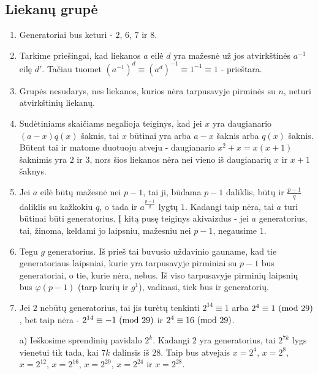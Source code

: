 \subsection*{Liekanų grupė} 
\begin{enumerate} 
\item 
Generatoriai bus keturi - $2$, $6$, $7$ ir $8$.
\item 
Tarkime priešingai, kad liekanos $a$ eilė $d$ yra mažesnė už jos
atvirkštinės $a^{-1}$ eilę $d'$. Tačiau tuomet $(a^{-1})^d \equiv
(a^d)^{-1} \equiv 1^{-1} \equiv 1$ - prieštara.
\item 
Grupės nesudarys, nes liekanos, kurios nėra tarpusavyje pirminės su
$n$, neturi atvirkštinių liekanų.
\item 
Sudėtiniams skaičiams negalioja teiginys, kad jei $x$ yra daugianario
$(a-x)q(x)$ šaknis, tai $x$ būtinai yra arba $a-x$ šaknis arba
$q(x)$ šaknis. Būtent tai ir matome duotuoju atveju - daugianario
$x^2+x = x(x+1)$ šaknimis yra $2$ ir $3$, nors šios liekanos nėra nei
vieno iš daugianarių $x$ ir $x+1$ šaknys. 
\item 
Jei $a$ eilė būtų mažesnė nei $p-1$, tai ji, būdama $p-1$ daliklis,
būtų ir $\frac{p-1}{q}$ daliklis su kažkokiu $q$, o tada ir
$a^{\frac{p-1}{q}}$ lygtų $1$. Kadangi taip nėra, tai $a$ turi būtinai
būti generatorius. Į kitą pusę teiginys akivaizdus - jei $a$
generatorius, tai, žinoma, keldami jo laipsniu, mažesniu nei
$p-1$, negausime $1$. 
\item 
Tegu $g$ generatorius. Iš prieš tai buvusio uždavinio gauname, kad tie
generatoriaus laipsniai, kurie yra tarpusavyje pirminiai su $p-1$ bus
generatoriai, o tie, kurie nėra, nebus. Iš viso tarpusavyje pirminių
laipsnių bus $\varphi(p-1)$ (tarp kurių ir $g^1$), vadinasi, tiek bus
ir generatorių.
\item 
Jei $2$ nebūtų generatorius, tai jis turėtų tenkinti $2^{14}\equiv 1$
arba $2^{4} \equiv 1 \ (\text{mod } 29)$, bet taip nėra - $2^{14}\equiv -1 \ (\text{mod } 29)$ ir
$2^4 \equiv 16 \ (\text{mod } 29)$.

a) Ieškosime sprendinių pavidalo $2^k$. Kadangi $2$ yra generatorius,
tai $2^{7k}$ lygs vienetui tik tada, kai $7k$ dalinsis iš $28$. Taip
bus atvejais $x=2^4$, $x=2^8$, $x=2^{12}$, $x=2^{16}$, $x=2^{20}$,
$x=2^{24}$ ir $x=2^{28}$. 


\end{enumerate}
